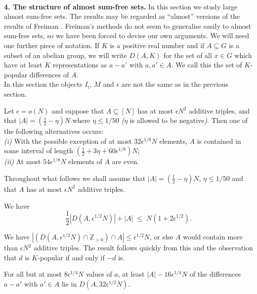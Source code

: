 \documentclass[a4paper,12pt]{article}
\begin{document}
\endproof\\[11pt]
\noindent\textbf{4. The structure of almost sum-free sets.} In this section we study large almost sum-free sets. The results may be regarded as ``almost'' versions of the results of Freiman \cite{Frei4}. Freiman's methods do not seem to generalise easily to almost sum-free sets, so we have been forced to devise our own arguments. We will need one further piece of notation. If $K$ is a positive real number and if $A \subseteq G$ is a subset of an abelian group, we will write $D(A,K)$ for the set of all $x \in G$ which have at least $K$ representations as $a - a'$ with $a,a' \in A$. We call this the set of $K$-popular differences of $A$.\\[11pt]
In this section the objects $I_i$, $M$ and $\epsilon$ are not the same as in the previous section.
\begin{propositionenv}
\label{prop15} Let $\epsilon = o(N)$ and
suppose that $A \subseteq [N]$ has at most $\epsilon N^2$ additive triples, and that $|A| = (\frac{1}{2} - \eta)N$ where $\eta  \leq 1/50$ \emph{(}$\eta$ is allowed to be negative\emph{)}. Then one of the following alternatives occurs:\\[11pt]
\emph{(i)} With the possible exception of at most $32\epsilon^{1/8}N$ elements, $A$ is contained in some interval of length $(\frac{1}{2} + 3\eta + 60\epsilon^{1/8})N$;\\
\emph{(ii)} At most $54\epsilon^{1/8} N$ elements of $A$ are even.
\end{propositionenv}
Throughout what follows we shall assume that $|A| = (\frac{1}{2} - \eta)N$, $\eta \leq 1/50$ and that $A$ has at most $\epsilon N^2$ additive triples.
\begin{lemmaenv}
We have \begin{equation}\label{star}\textstyle\frac{1}{2}\displaystyle|D(A,\epsilon^{1/2} N)| + |A| \; \leq \; N(1 + 2\epsilon^{1/2}).\end{equation}
\end{lemmaenv}
\proof We have $\left|\left(D(A,\epsilon^{1/2} N) \cap \mathbb{Z}_{>0}\right) \cap A\right| \leq \epsilon^{1/2} N$, or else $A$ would contain more than $\epsilon N^2$ additive triples. The result follows quickly from this and the observation that $d$ is $K$-popular if and only if $-d$ is.\endproof
\begin{lemmaenv}\label{lem2}
For all but at most $8\epsilon^{1/4}N$ values of $a$, at least $|A|-16\epsilon^{1/4}N$ of the differences $a - a'$ with $a' \in A$ lie in $D(A,32\epsilon^{1/2} N)$.
\end{lemmaenv}
\end{document}
